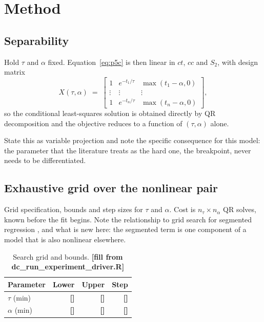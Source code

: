 \documentclass[11pt,a4paper]{article}
\newcommand{\FILL}[1]{\textbf{\textcolor{coneC}{[#1]}}}
\newcommand{\Sii}{S_2}
\begin{document}
\section{Method}

\subsection{Separability}
Hold $\tau$ and $\alpha$ fixed. Equation~\eqref{eq:p5c} is then linear in
$ct$, $cc$ and $\Sii$, with design matrix
\begin{equation}
X(\tau,\alpha) \;=\;
\begin{bmatrix}
1 & e^{-t_1/\tau} & \max(t_1-\alpha,0)\\
\vdots & \vdots & \vdots\\
1 & e^{-t_n/\tau} & \max(t_n-\alpha,0)
\end{bmatrix},
\end{equation}
so the conditional least-squares solution is obtained directly by QR
decomposition and the objective reduces to a function of $(\tau,\alpha)$
alone.

\begin{towrite}
State this as variable projection \citep{Golub:1973aa,Golub:2003aa} and note
the specific consequence for this model: the parameter that the literature
treats as the hard one, the breakpoint, never needs to be differentiated.
\end{towrite}

\subsection{Exhaustive grid over the nonlinear pair}
\begin{towrite}
Grid specification, bounds and step sizes for $\tau$ and $\alpha$. Cost is
$n_\tau \times n_\alpha$ QR solves, known before the fit begins. Note the
relationship to grid search for segmented regression
\citep{Hudson:1966aa,Lerman:1980aa}, and what is new here: the segmented
term is one component of a model that is also nonlinear elsewhere.
\end{towrite}

\begin{table}[h]
\centering
\caption{Search grid and bounds. \FILL{fill from dc\_run\_experiment\_driver.R}}
\begin{tabular}{lrrr}
\toprule
Parameter & Lower & Upper & Step \\
\midrule
$\tau$ (min) & \FILL{} & \FILL{} & \FILL{} \\
$\alpha$ (min) & \FILL{} & \FILL{} & \FILL{} \\
\bottomrule
\end{tabular}
\end{table}
\end{document}
